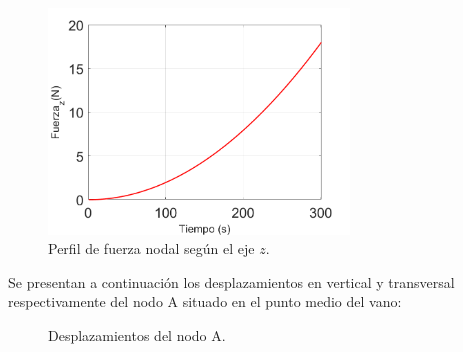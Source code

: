 \begin{figure}[h]
	\centering
	\includegraphics[width=80mm]{./imagenes/ResultadosNumericos/SimpleCable/FuerzaNodalZ_TLFoti.png}
	\caption{Perfil de fuerza nodal según el eje $z$.}
	\label{fig:RN:FotiCable:FuerzaZ}
\end{figure}



Se presentan a continuación los desplazamientos en vertical y transversal respectivamente del nodo A situado en el punto medio del vano:

\begingroup
\centering
\begin{figure}[htbp]
	\centering
	\caption{Desplazamientos del nodo A.} \label{fig:RN:FotiCable:DispsA}
\end{figure}
\endgroup

